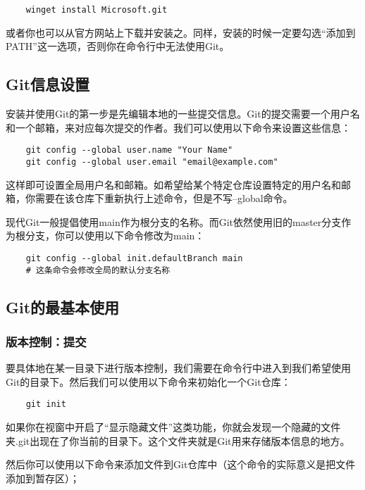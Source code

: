 \documentclass[../main.tex]{subfiles}
\begin{document}
\begin{verbatim}
    winget install Microsoft.git
\end{verbatim}

或者你也可以从官方网站上下载并安装之。同样，安装的时候一定要勾选“添加到PATH”这一选项，否则你在命令行中无法使用Git。

\subsection{Git信息设置}

安装并使用Git的第一步是先编辑本地的一些提交信息。Git的提交需要一个用户名和一个邮箱，来对应每次提交的作者。我们可以使用以下命令来设置这些信息：

\begin{verbatim}
    git config --global user.name "Your Name"
    git config --global user.email "email@example.com"
\end{verbatim}

这样即可设置全局用户名和邮箱。如希望给某个特定仓库设置特定的用户名和邮箱，你需要在该仓库下重新执行上述命令，但是不写--global命令。

现代Git一般提倡使用main作为根分支的名称。而Git依然使用旧的master分支作为根分支，你可以使用以下命令修改为main：

\begin{verbatim}
    git config --global init.defaultBranch main 
    # 这条命令会修改全局的默认分支名称
\end{verbatim}

\subsection{Git的最基本使用}

\subsubsection{版本控制：提交}

要具体地在某一目录下进行版本控制，我们需要在命令行中进入到我们希望使用Git的目录下。然后我们可以使用以下命令来初始化一个Git仓库：

\begin{verbatim}
    git init
\end{verbatim}

如果你在视窗中开启了“显示隐藏文件”这类功能，你就会发现一个隐藏的文件夹.git出现在了你当前的目录下。这个文件夹就是Git用来存储版本信息的地方。

然后你可以使用以下命令来添加文件到Git仓库中（这个命令的实际意义是把文件添加到暂存区）；
\end{document}
